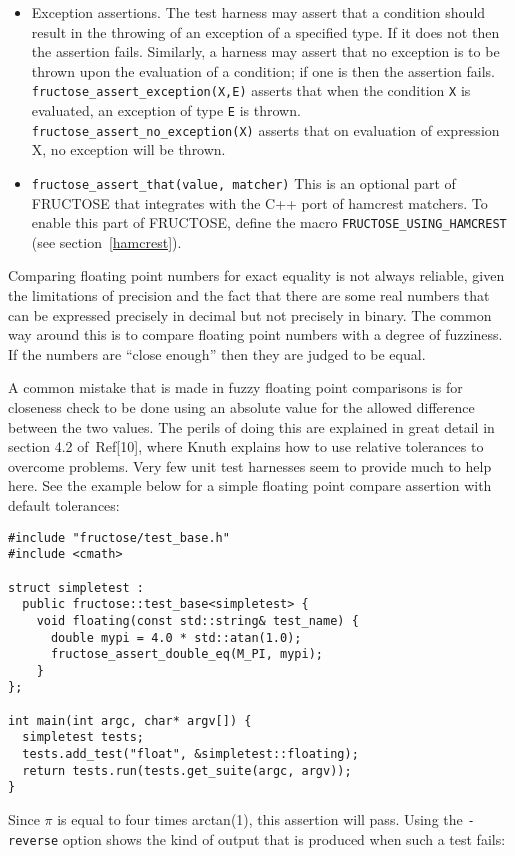 \documentclass{book}
\begin{document}
\begin{itemize}
\item Exception assertions.\hfil\break
The test harness may assert that a condition should result in
the throwing of an exception of a specified type. If it does not
then the assertion fails. Similarly, a harness may assert that
no exception is to be thrown upon the evaluation of a condition;
if one is then the assertion fails.
{\tt fructose\_assert\_exception(X,E)} asserts that when
the condition {\tt X} is evaluated, an exception of type {\tt E}
is thrown.
{\tt fructose\_assert\_no\_exception(X)} asserts that on evaluation of
expression X, no exception will be thrown.

\item {\tt fructose\_assert\_that(value, matcher)}\hfil\break
This is an optional part of FRUCTOSE that integrates with
the C++ port of hamcrest matchers. To enable this part of
FRUCTOSE, define the macro {\tt FRUCTOSE\_USING\_HAMCREST}
(see section~\ref{hamcrest}).

\end{itemize}

\label{floatingpoint}

Comparing floating point numbers for exact equality
is not always reliable, given the limitations of precision
and the fact that there are some real numbers that can be
expressed precisely in decimal but not precisely in binary.
The common way around this is to compare floating point
numbers with a degree of fuzziness. 
If the numbers are ``close enough''
then they are judged to be equal.

A common mistake that is made in fuzzy floating point comparisons
is for closeness check to be done using an absolute value for
the allowed difference between the two values.
The perils of doing this are explained in great detail
in section 4.2 of~Ref[10], where Knuth explains how to use relative
tolerances to overcome problems.
Very few unit test harnesses seem to provide much to help here.
See the example below for a simple floating point compare assertion
with default tolerances:

\begin{verbatim}
#include "fructose/test_base.h"
#include <cmath>

struct simpletest : 
  public fructose::test_base<simpletest> {
    void floating(const std::string& test_name) {
      double mypi = 4.0 * std::atan(1.0);
      fructose_assert_double_eq(M_PI, mypi);
    }
};

int main(int argc, char* argv[]) {
  simpletest tests;
  tests.add_test("float", &simpletest::floating);
  return tests.run(tests.get_suite(argc, argv));
}
\end{verbatim}
Since $\pi$ is equal to four times arctan(1), this assertion
will pass. Using the {\tt -reverse} option shows the kind of
output that is produced when such a test fails:
\end{document}
